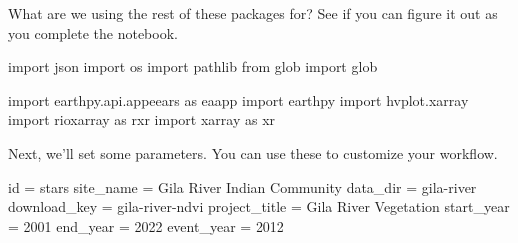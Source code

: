 \documentclass[
  letterpaper,
  DIV=11,
  numbers=noendperiod,
  oneside]{scrreprt}
\newenvironment{Shaded}{\begin{snugshade}}{\end{snugshade}}
\newcommand{\BuiltInTok}[1]{\textcolor[rgb]{0.00,0.23,0.31}{#1}}
\newcommand{\DecValTok}[1]{\textcolor[rgb]{0.68,0.00,0.00}{#1}}
\newcommand{\ImportTok}[1]{\textcolor[rgb]{0.00,0.46,0.62}{#1}}
\newcommand{\NormalTok}[1]{\textcolor[rgb]{0.00,0.23,0.31}{#1}}
\newcommand{\OperatorTok}[1]{\textcolor[rgb]{0.37,0.37,0.37}{#1}}
\newcommand{\StringTok}[1]{\textcolor[rgb]{0.13,0.47,0.30}{#1}}
\begin{document}
\begin{tcolorbox}[enhanced jigsaw, colbacktitle=quarto-callout-color!10!white, opacityback=0, bottomtitle=1mm, toptitle=1mm, bottomrule=.15mm, left=2mm, colframe=quarto-callout-color-frame, leftrule=.75mm, opacitybacktitle=0.6, colback=white, rightrule=.15mm, toprule=.15mm, breakable, titlerule=0mm, title=\textcolor{quarto-callout-color}{\faInfo}\hspace{0.5em}{Reflect and Respond}, coltitle=black, arc=.35mm]

What are we using the rest of these packages for? See if you can figure
it out as you complete the notebook.

\end{tcolorbox}

\begin{Shaded}
\begin{Highlighting}[]
\ImportTok{import}\NormalTok{ json}
\ImportTok{import}\NormalTok{ os}
\ImportTok{import}\NormalTok{ pathlib}
\ImportTok{from}\NormalTok{ glob }\ImportTok{import}\NormalTok{ glob}

\ImportTok{import}\NormalTok{ earthpy.api.appeears }\ImportTok{as}\NormalTok{ eaapp}
\ImportTok{import}\NormalTok{ earthpy}
\ImportTok{import}\NormalTok{ hvplot.xarray}
\ImportTok{import}\NormalTok{ rioxarray }\ImportTok{as}\NormalTok{ rxr}
\ImportTok{import}\NormalTok{ xarray }\ImportTok{as}\NormalTok{ xr}
\end{Highlighting}
\end{Shaded}

Next, we'll set some parameters. You can use these to customize your
workflow.

\begin{Shaded}
\begin{Highlighting}[]
\BuiltInTok{id} \OperatorTok{=} \StringTok{\textquotesingle{}stars\textquotesingle{}}
\NormalTok{site\_name }\OperatorTok{=} \StringTok{\textquotesingle{}Gila River Indian Community\textquotesingle{}}
\NormalTok{data\_dir }\OperatorTok{=} \StringTok{\textquotesingle{}gila{-}river\textquotesingle{}}
\NormalTok{download\_key }\OperatorTok{=} \StringTok{\textquotesingle{}gila{-}river{-}ndvi\textquotesingle{}}
\NormalTok{project\_title }\OperatorTok{=} \StringTok{\textquotesingle{}Gila River Vegetation\textquotesingle{}}
\NormalTok{start\_year }\OperatorTok{=} \DecValTok{2001}
\NormalTok{end\_year }\OperatorTok{=} \DecValTok{2022}
\NormalTok{event\_year }\OperatorTok{=} \DecValTok{2012}
\end{Highlighting}
\end{Shaded}
\end{document}
